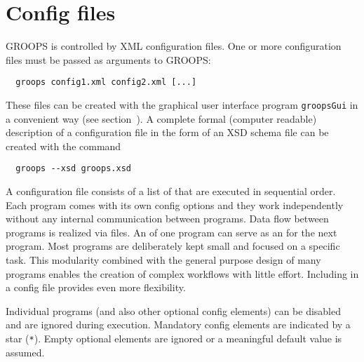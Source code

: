 \section{Config files}\label{general.configFiles}
GROOPS is controlled by XML configuration files. One or more configuration files
must be passed as arguments to GROOPS:
\begin{verbatim}
  groops config1.xml config2.xml [...]
\end{verbatim}
These files can be created with the graphical user interface program \verb|groopsGui|
in a convenient way (see section~).
A complete formal (computer readable) description of a configuration file
in the form of an XSD schema file can be created with the command
\begin{verbatim}
  groops --xsd groops.xsd
\end{verbatim}

A configuration file consists of a list of 
that are executed in sequential order. Each program comes with its own config options
and they work independently without any internal communication between programs.
Data flow between programs is realized via files. An  of one program can serve as
an  for the next program.
Most programs are deliberately kept small and focused on a specific task. This modularity combined with the
general purpose design of many programs enables the creation of complex workflows with little effort.
Including  in a config file provides even more flexibility.

Individual programs (and also other optional config elements) can be disabled
and are ignored during execution. Mandatory config elements are indicated by a star (\verb|*|).
Empty optional elements are ignored or a meaningful default value is assumed.

